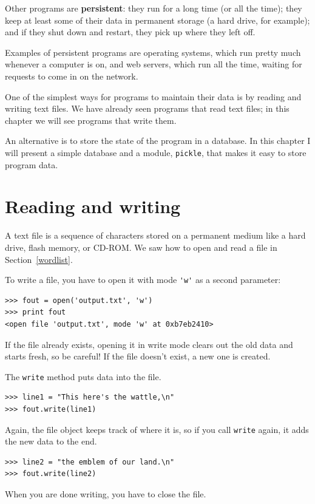 \documentclass[10pt]{book}
\begin{document}
\begin{CJK}{UTF8}{gbsn}
Other programs are {\bf persistent}: they run for a long time
(or all the time); they keep at least some of their data
in permanent storage (a hard drive, for example); and
if they shut down and restart, they pick up where they left off.

Examples of persistent programs are operating systems, which
run pretty much whenever a computer is on, and web servers,
which run all the time, waiting for requests to come in on
the network.

One of the simplest ways for programs to maintain their data
is by reading and writing text files.  We have already seen
programs that read text files; in this chapter we will see programs
that write them.

An alternative is to store the state of the program in a database.
In this chapter I will present a simple database and a module,
{\tt pickle}, that makes it easy to store program data.


\section{Reading and writing}

A text file is a sequence of characters stored on a permanent
medium like a hard drive, flash memory, or CD-ROM.  We saw how
to open and read a file in Section~\ref{wordlist}.

To write a file, you have to open it with mode \verb"'w'" as a second
parameter:

\begin{verbatim}
>>> fout = open('output.txt', 'w')
>>> print fout
<open file 'output.txt', mode 'w' at 0xb7eb2410>
\end{verbatim}
%
If the file already exists, opening it in write mode clears out
the old data and starts fresh, so be careful!
If the file doesn't exist, a new one is created.

The {\tt write} method puts data into the file.

\begin{verbatim}
>>> line1 = "This here's the wattle,\n"
>>> fout.write(line1)
\end{verbatim}
%
Again, the file object keeps track of where it is, so if
you call {\tt write} again, it adds the new data to the end.

\begin{verbatim}
>>> line2 = "the emblem of our land.\n"
>>> fout.write(line2)
\end{verbatim}
%
When you are done writing, you have to close the file.


\end{CJK}
\end{document}
